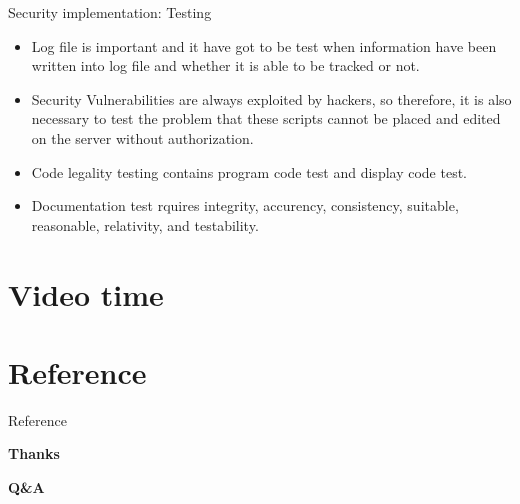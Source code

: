 \documentclass[aspectratio=169]{beamer}
\begin{document}
\begin{frame}[fragile]{Security implementation: Testing}
  \begin{itemize}
      \item Log file is important and it have got to be test when information
      have been written into log file and whether it is able to be tracked 
      or not.
      \item Security Vulnerabilities are always exploited by hackers, so therefore,
      it is also necessary to test the problem that these scripts cannot be placed
      and edited on the server without authorization.
      \item Code legality testing contains program code test and display code test.
      \item Documentation test rquires integrity, accurency, consistency, suitable,
      reasonable, relativity, and testability.
  \end{itemize}
\end{frame}

\section{Video time}

\section{Reference}

\begin{frame}[allowframebreaks]{Reference}

   \printbibliography[heading=none]
 
\end{frame}

\begin{frame}{}
  \textbf{Thanks}

  \textbf{Q\&A}
\end{frame}
\end{document}

